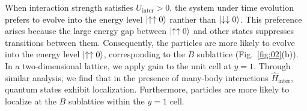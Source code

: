 \documentclass[longbibliography, aps, prx, amsmath, amssymb, amsfonts, twocolumn,superscriptaddress, footinbib]{revtex4-1}
\begin{document}
	When interaction strength satisfies $U_{\text{inter}}>0$, the system under time evolution prefers to evolve into the energy level $\ket{\uparrow\uparrow0}$ ranther than $\ket{\downarrow\downarrow0}$. 
	This preference arises because the large energy gap between $\ket{\uparrow\uparrow0}$ and other states suppresses transitions between them.
	Consequently, the particles are more likely to evolve into the energy level $\ket{\uparrow\uparrow0}$, corresponding to the $B$ sublattice (Fig.~\ref{fig:02}(b)). 
	In a two-dimensional lattice, we apply gain to the unit cell at $y=1$. Through similar analysis, we find that in the presence of many-body interactions $\hat{H}_{\text{inter}}$, quantum states exhibit localization. Furthermore, particles are more likely to localize at the $B$ sublattice within the $y=1$ cell. 


\end{document}
